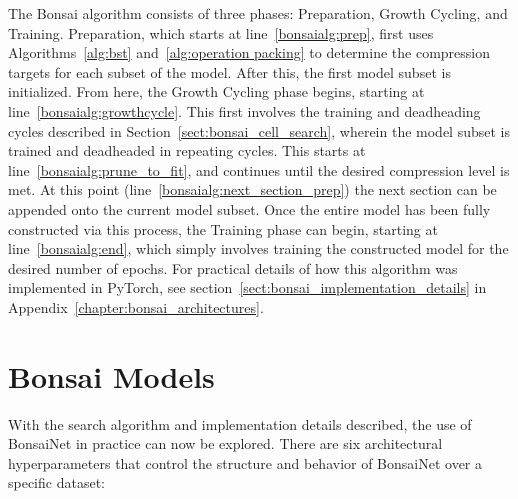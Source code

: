 The Bonsai algorithm consists of three phases: Preparation, Growth Cycling, and Training. Preparation, which starts
at line~\ref{bonsaialg:prep}, first uses Algorithms~\ref{alg:bst} and~\ref{alg:operation packing} to determine the
compression targets for each subset of the model. After this, the first model subset is initialized. From here,
the Growth Cycling phase begins, starting at line~\ref{bonsaialg:growthcycle}. This first involves the
training and deadheading cycles described in Section~\ref{sect:bonsai_cell_search}, wherein the model subset is trained and deadheaded in repeating cycles.
This starts at line~\ref{bonsaialg:prune_to_fit}, and continues until the desired compression level is met. At this point (line~\ref{bonsaialg:next_section_prep})
the next section can be appended onto the current model subset. Once the entire model has been fully constructed via this process, the
Training phase can begin, starting at line~\ref{bonsaialg:end}, which simply involves training the constructed model for the desired number
of epochs. For practical details of how this algorithm was implemented in PyTorch, see section~\ref{sect:bonsai_implementation_details}
in Appendix~\ref{chapter:bonsai_architectures}.


\section{Bonsai Models}\label{sect:bonsai_model_design}
With the search algorithm and implementation details described, the use of BonsaiNet in practice can now be explored. There
are six architectural hyperparameters that control the structure and behavior of BonsaiNet over a specific dataset:

